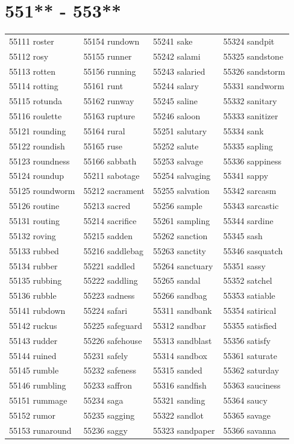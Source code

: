 \documentclass[10pt, oneside]{book}
\begin{document}
\begin{table}
	\centering
	\section*{551** - 553**}
	\begin{tabular}{l l l l}
55111 roster &55154 rundown &55241 sake &55324 sandpit\\
55112 rosy &55155 runner &55242 salami &55325 sandstone\\
55113 rotten &55156 running &55243 salaried &55326 sandstorm\\
55114 rotting &55161 runt &55244 salary &55331 sandworm\\
55115 rotunda &55162 runway &55245 saline &55332 sanitary\\
55116 roulette &55163 rupture &55246 saloon &55333 sanitizer\\
55121 rounding &55164 rural &55251 salutary &55334 sank\\
55122 roundish &55165 ruse &55252 salute &55335 sapling\\
55123 roundness &55166 sabbath &55253 salvage &55336 sappiness\\
55124 roundup &55211 sabotage &55254 salvaging &55341 sappy\\
55125 roundworm &55212 sacrament &55255 salvation &55342 sarcasm\\
55126 routine &55213 sacred &55256 sample &55343 sarcastic\\
55131 routing &55214 sacrifice &55261 sampling &55344 sardine\\
55132 roving &55215 sadden &55262 sanction &55345 sash\\
55133 rubbed &55216 saddlebag &55263 sanctity &55346 sasquatch\\
55134 rubber &55221 saddled &55264 sanctuary &55351 sassy\\
55135 rubbing &55222 saddling &55265 sandal &55352 satchel\\
55136 rubble &55223 sadness &55266 sandbag &55353 satiable\\
55141 rubdown &55224 safari &55311 sandbank &55354 satirical\\
55142 ruckus &55225 safeguard &55312 sandbar &55355 satisfied\\
55143 rudder &55226 safehouse &55313 sandblast &55356 satisfy\\
55144 ruined &55231 safely &55314 sandbox &55361 saturate\\
55145 rumble &55232 safeness &55315 sanded &55362 saturday\\
55146 rumbling &55233 saffron &55316 sandfish &55363 sauciness\\
55151 rummage &55234 saga &55321 sanding &55364 saucy\\
55152 rumor &55235 sagging &55322 sandlot &55365 savage\\
55153 runaround &55236 saggy &55323 sandpaper &55366 savanna\\
	\end{tabular}
 \end{table}
\clearpage
\end{document}
